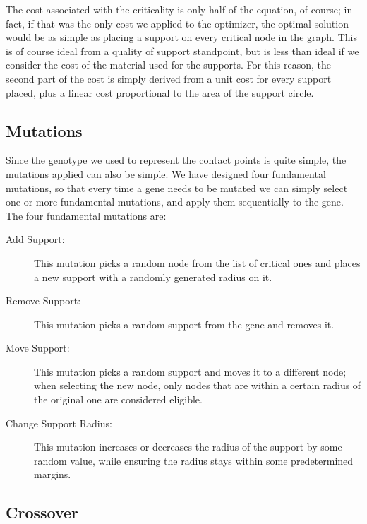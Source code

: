 The cost associated with the criticality is only half of the equation, of course;
in fact, if that was the only cost we applied to the optimizer, the optimal solution
would be as simple as placing a support on every critical node in the graph.
This is of course ideal from a quality of support standpoint, but is less than ideal
if we consider the cost of the material used for the supports.
For this reason, the second part of the cost is simply derived from a unit cost
for every support placed, plus a linear cost proportional to the area of the support
circle.


\subsection{Mutations}
\label{sec:contact_points_opt_mut}

Since the genotype we used to represent the contact points is quite simple, the
mutations applied can also be simple. We have designed four fundamental
mutations, so that every time a gene needs to be mutated we can simply
select one or more fundamental mutations, and apply them sequentially to the gene.
The four fundamental mutations are:
\begin{description}
    \item [ Add Support: ] This mutation picks a random node from the list of critical
    ones and places a new support with a randomly generated radius on it.
    \item [ Remove Support: ] This mutation picks a random support from the gene
    and removes it.
    \item [ Move Support: ] This mutation picks a random support and moves it to a different
    node; when selecting the new node, only nodes that are within a certain radius of the original
    one are considered eligible.
    \item [ Change Support Radius: ] This mutation increases or decreases the radius
    of the support by some random value, while ensuring the radius stays within some
    predetermined margins.
\end{description}

\subsection{Crossover}
\label{sec:contact_points_opt_cross}

